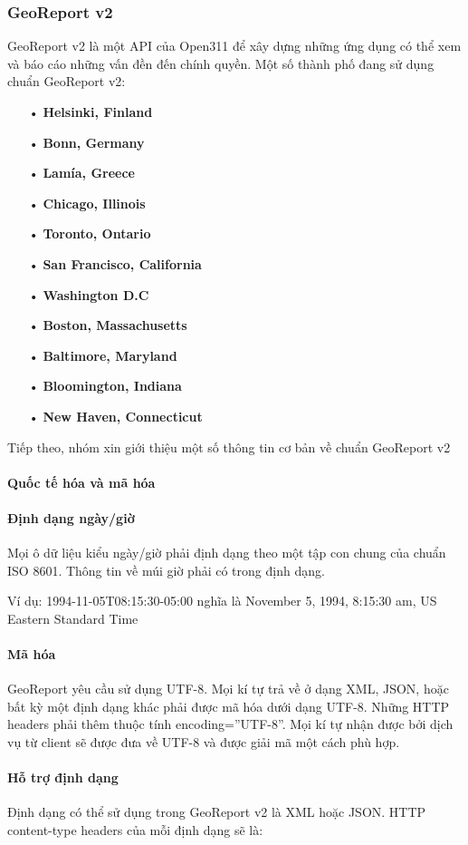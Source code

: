 \documentclass[a4paper]{article}
\begin{document}
\subsubsection{GeoReport v2}
GeoReport v2 là một API của Open311 để xây dựng những ứng dụng có thể xem và báo cáo những vấn đền đến chính quyền.
Một số thành phố đang sử dụng chuẩn GeoReport v2:
\begin{itemize}
	\item[•]\textbf{Helsinki, Finland}
	\item[•]\textbf{Bonn, Germany}
	\item[•]\textbf{Lamía, Greece}
	\item[•]\textbf{Chicago, Illinois}
	\item[•]\textbf{Toronto, Ontario}
	\item[•]\textbf{San Francisco, California}
	\item[•]\textbf{Washington D.C}
	\item[•]\textbf{Boston, Massachusetts}
	\item[•]\textbf{Baltimore, Maryland}
	\item[•]\textbf{Bloomington, Indiana}		\item[•]\textbf{New Haven, Connecticut}							
\end{itemize}
Tiếp theo, nhóm xin giới thiệu một số thông tin cơ bản về chuẩn GeoReport v2
\paragraph{Quốc tế hóa và mã hóa}
\paragraph*{Định dạng ngày/giờ}
Mọi ô dữ liệu kiểu ngày/giờ phải định dạng theo một tập con chung của chuẩn ISO 8601. Thông tin về múi giờ phải có trong định dạng.

Ví dụ: 1994-11-05T08:15:30-05:00 nghĩa là  November 5, 1994, 8:15:30 am, US Eastern Standard Time

\paragraph*{Mã hóa}
GeoReport yêu cầu sử dụng UTF-8. Mọi kí tự trả về ở dạng XML, JSON, hoặc bất kỳ một định dạng khác phải được mã hóa dưới dạng UTF-8. Những HTTP headers phải thêm thuộc tính encoding=”UTF-8”. Mọi kí tự nhận được bởi dịch vụ từ client sẽ được đưa về UTF-8 và được giải mã một cách phù hợp. 
\paragraph{Hỗ trợ định dạng}
Định dạng có thể sử dụng trong GeoReport v2 là XML hoặc JSON.
HTTP content-type headers của mỗi định dạng sẽ là: 
\end{document}
